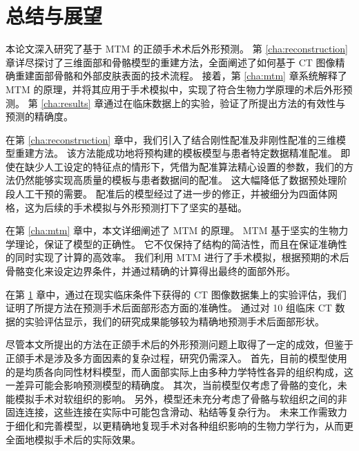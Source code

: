 
\chapter{总结与展望}
\label{cha:concolusion}

本论文深入研究了基于 MTM 的正颌手术术后外形预测。
第 \ref{cha:reconstruction} 章详尽探讨了三维面部和骨骼模型的重建方法，全面阐述了如何基于 CT 图像精确重建面部骨骼和外部皮肤表面的技术流程。
接着，第 \ref{cha:mtm} 章系统解释了 MTM 的原理，并将其应用于手术模拟中，实现了符合生物力学原理的术后外形预测。
第 \ref{cha:results} 章通过在临床数据上的实验，验证了所提出方法的有效性与预测的精确度。

在第 \ref{cha:reconstruction} 章中，我们引入了结合刚性配准及非刚性配准的三维模型重建方法。
该方法能成功地将预构建的模板模型与患者特定数据精准配准。
即使在缺少人工设定的特征点的情形下，凭借为配准算法精心设置的参数，我们的方法仍然能够实现高质量的模板与患者数据间的配准。
这大幅降低了数据预处理阶段人工干预的需要。
配准后的模型经过了进一步的修正，并被细分为四面体网格，这为后续的手术模拟与外形预测打下了坚实的基础。

在第 \ref{cha:mtm} 章中，本文详细阐述了 MTM 的原理。
MTM 基于坚实的生物力学理论，保证了模型的正确性。
它不仅保持了结构的简洁性，而且在保证准确性的同时实现了计算的高效率。
我们利用 MTM 进行了手术模拟，根据预期的术后骨骼变化来设定边界条件，并通过精确的计算得出最终的面部外形。

在第 \ref{cha:concolusion} 章中，通过在现实临床条件下获得的 CT 图像数据集上的实验评估，我们证明了所提方法在预测手术后面部形态方面的准确性。
通过对 10 组临床 CT 数据的实验评估显示，我们的研究成果能够较为精确地预测手术后面部形状。

尽管本文所提出的方法在正颌手术后的外形预测问题上取得了一定的成效，但鉴于正颌手术是涉及多方面因素的复杂过程，研究仍需深入。
首先，目前的模型使用的是均质各向同性材料模型，而人面部实际上由多种力学特性各异的组织构成，这一差异可能会影响预测模型的精确度。
其次，当前模型仅考虑了骨骼的变化，未能模拟手术对软组织的影响。
另外，模型还未充分考虑了骨骼与软组织之间的非固连连接，这些连接在实际中可能包含滑动、粘结等复杂行为。
未来工作需致力于细化和完善模型，以更精确地复现手术对各种组织影响的生物力学行为，从而更全面地模拟手术后的实际效果。
